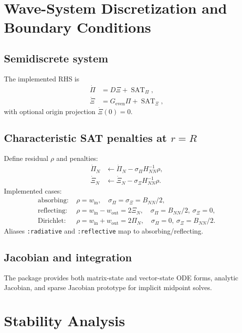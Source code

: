 \documentclass[
  aps,
  pre,
  reprint,
  superscriptaddress,
  nofootinbib
]{revtex4-2}
\newcommand{\sat}{\operatorname{SAT}}
\newcommand{\Ge}{G_{\mathrm{even}}}
\begin{document}
\section{Wave-System Discretization and Boundary Conditions}
\subsection{Semidiscrete system}
The implemented RHS is
\begin{align}
\dot{\Pi} &= D\Xi + \sat_{\Pi},\\
\dot{\Xi} &= \Ge\Pi + \sat_{\Xi},
\end{align}
with optional origin projection $\dot{\Xi}(0)=0$.

\subsection{Characteristic SAT penalties at \texorpdfstring{$r=R$}{r=R}}
Define residual $\rho$ and penalties:
\begin{align}
\dot{\Pi}_N &\leftarrow \dot{\Pi}_N - \sigma_{\Pi}H_{NN}^{-1}\rho,\\
\dot{\Xi}_N &\leftarrow \dot{\Xi}_N - \sigma_{\Xi}H_{NN}^{-1}\rho.
\end{align}
Implemented cases:
\begin{align}
\text{absorbing: }&
\rho=w_{\mathrm{in}},\quad \sigma_{\Pi}=\sigma_{\Xi}=B_{NN}/2,\\
\text{reflecting: }&
\rho=w_{\mathrm{in}}-w_{\mathrm{out}}=2\Xi_N,\quad \sigma_{\Pi}=B_{NN}/2,\ \sigma_{\Xi}=0,\\
\text{Dirichlet: }&
\rho=w_{\mathrm{in}}+w_{\mathrm{out}}=2\Pi_N,\quad \sigma_{\Pi}=0,\ \sigma_{\Xi}=B_{NN}/2.
\end{align}
Aliases \texttt{:radiative} and \texttt{:reflective} map to absorbing/reflecting.

\subsection{Jacobian and integration}
The package provides both matrix-state and vector-state ODE forms, analytic Jacobian,
and sparse Jacobian prototype for implicit midpoint solves.

\section{Stability Analysis}
\end{document}
